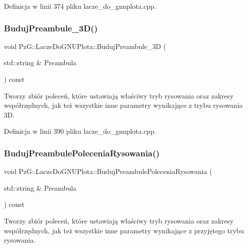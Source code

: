 Definicja w linii 374 pliku lacze\+\_\+do\+\_\+gnuplota.\+cpp.

\mbox{\label{class_pz_g_1_1_lacze_do_g_n_u_plota_a50a544677e52829cac4dd4a95b821dcb}} 
\subsubsection{\texorpdfstring{BudujPreambule\_3D()}{BudujPreambule\_3D()}}
{\footnotesize\ttfamily void Pz\+G\+::\+Lacze\+Do\+G\+N\+U\+Plota\+::\+Buduj\+Preambule\+\_\+3D (\begin{DoxyParamCaption}\item[{std\+::string \&}]{Preambula }\end{DoxyParamCaption}) const\hspace{0.3cm}{\ttfamily [protected]}}

Tworzy zbiór poleceń, które ustawiają właściwy tryb rysowania oraz zakresy współrzędnych, jak też wszystkie inne parametry wynikające z trybu rysowania 3D. 

Definicja w linii 390 pliku lacze\+\_\+do\+\_\+gnuplota.\+cpp.

\mbox{\label{class_pz_g_1_1_lacze_do_g_n_u_plota_a0da98f68f533070d5a32adbdb519cf56}} 
\subsubsection{\texorpdfstring{BudujPreambulePoleceniaRysowania()}{BudujPreambulePoleceniaRysowania()}}
{\footnotesize\ttfamily void Pz\+G\+::\+Lacze\+Do\+G\+N\+U\+Plota\+::\+Buduj\+Preambule\+Polecenia\+Rysowania (\begin{DoxyParamCaption}\item[{std\+::string \&}]{Preambula }\end{DoxyParamCaption}) const\hspace{0.3cm}{\ttfamily [protected]}}

Tworzy zbiór poleceń, które ustawiają właściwy tryb rysowania oraz zakresy współrzędnych, jak też wszystkie inne parametry wynikające z przyjętego trybu rysowania. 

